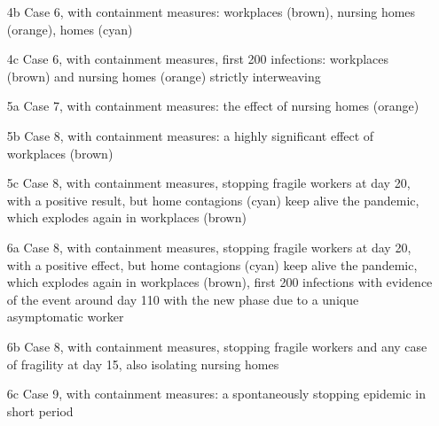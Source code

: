 \documentclass[graybox]{svmult}
\begin{document}
\begin{itemize}
\item [4b] Case 6, with containment measures: workplaces (brown), nursing homes (orange), homes (cyan)
\item [4c] Case 6, with containment measures, first 200 infections: workplaces (brown) and nursing homes (orange) strictly interweaving
\item [5a] Case 7, with containment measures: the effect of nursing homes (orange)
\item [5b] Case 8, with containment measures: a highly significant effect of workplaces (brown)
\item [5c] Case 8, with containment measures, stopping fragile workers at day 20, with a positive result, but home contagions (cyan) keep alive the pandemic, which explodes again in workplaces (brown)
\item [6a] Case 8, with containment measures, stopping fragile workers at day 20, with a positive effect, but home contagions (cyan) keep alive the pandemic, which explodes again in workplaces (brown), first 200 infections with evidence of the event around day 110 with the new phase due to a unique asymptomatic worker
\item [6b] Case 8, with containment measures, stopping fragile workers and any case of fragility at day 15, also isolating nursing homes
\item [6c] Case 9, with containment measures: a spontaneously stopping epidemic in  short period
\end{itemize}






\end{document}
